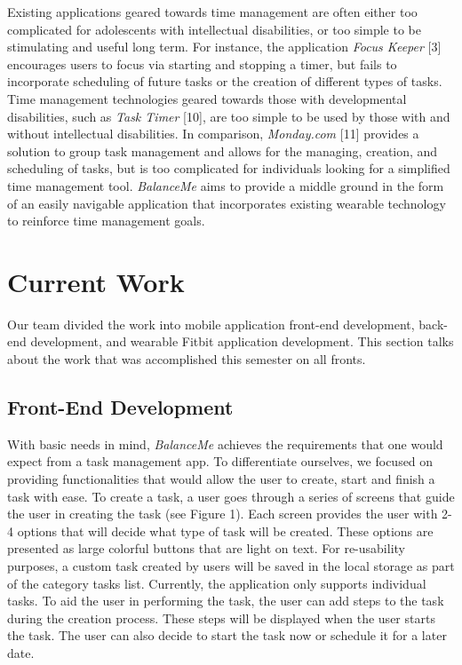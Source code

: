 \documentclass{sigchi}
\begin{document}
Existing applications geared towards time management are often either too
complicated for adolescents with intellectual disabilities, or too simple to be
stimulating and useful long term. For instance, the application
\textit{Focus Keeper} [3] encourages users to focus via starting and stopping a
timer, but fails to incorporate scheduling of future tasks or the creation of
different types of tasks. Time management technologies geared towards those with
developmental disabilities, such as \textit{Task Timer} [10], are too simple to
be used by those with and without intellectual disabilities. In comparison,
\textit{Monday.com} [11] provides a solution to group task management and
allows for the managing, creation, and scheduling of tasks, but is too
complicated for individuals looking for a simplified time management tool.
\textit{BalanceMe} aims to provide a middle ground in the form of an easily
navigable application that incorporates existing wearable technology to
reinforce time management goals.


\section{Current Work}

Our team divided the work into mobile application front-end development,
back-end development, and wearable Fitbit application development. This section
talks about the work that was accomplished this semester on all fronts.


\subsection{Front-End Development}

With basic needs in mind, \textit{BalanceMe} achieves the requirements that one
would expect from a task management app. To differentiate ourselves, we focused
on providing functionalities that would allow the user to create, start and
finish a task with ease. To create a task, a user goes through a series of
screens that guide the user in creating the task (see Figure 1). Each screen
provides the user with 2-4 options that will decide what type of task will be
created. These options are presented as large colorful buttons that are light
on text. For re-usability purposes, a custom task created by users will be
saved in the local storage as part of the category tasks list. Currently, the
application only supports individual tasks. To aid the user in performing the
task, the user can add steps to the task during the creation process. These
steps will be displayed when the user starts the task. The user can also decide
to start the task now or schedule it for a later date.
\end{document}
